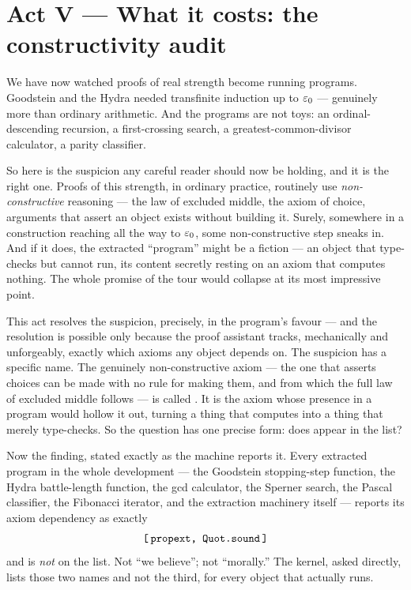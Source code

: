 \documentclass[11pt]{article}
\begin{document}
\section{Act V --- What it costs: the constructivity audit}

We have now watched proofs of real strength become running programs. Goodstein
and the Hydra needed transfinite induction up to $\varepsilon_0$ --- genuinely more than
ordinary arithmetic. And the programs are not toys: an ordinal-descending
recursion, a first-crossing search, a greatest-common-divisor calculator, a
parity classifier.

So here is the suspicion any careful reader should now be holding, and it is the
right one. Proofs of this strength, in ordinary practice, routinely use
\emph{non-constructive} reasoning --- the law of excluded middle, the axiom of
choice, arguments that assert an object exists without building it. Surely,
somewhere in a construction reaching all the way to $\varepsilon_0$, some
non-constructive step sneaks in. And if it does, the extracted ``program'' might
be a fiction --- an object that type-checks but cannot run, its content secretly
resting on an axiom that computes nothing. The whole promise of the tour would
collapse at its most impressive point.

This act resolves the suspicion, precisely, in the program's favour --- and the
resolution is possible only because the proof assistant tracks, mechanically and
unforgeably, exactly which axioms any object depends on. The suspicion has a
specific name. The genuinely non-constructive axiom --- the one that asserts
choices can be made with no rule for making them, and from which the full law of
excluded middle follows --- is called . It is the axiom
whose presence in a program would hollow it out, turning a thing that computes
into a thing that merely type-checks. So the question has one precise form: does
 appear in the list?

Now the finding, stated exactly as the machine reports it. Every extracted
program in the whole development --- the Goodstein stopping-step function, the
Hydra battle-length function, the gcd calculator, the Sperner search, the Pascal
classifier, the Fibonacci iterator, and the extraction machinery itself ---
reports its axiom dependency as exactly
\[
  \texttt{[\,propext,\ Quot.sound\,]}
\]
and  is \emph{not} on the list. Not ``we believe''; not
``morally.'' The kernel, asked directly, lists those two names and not the
third, for every object that actually runs.
\end{document}
